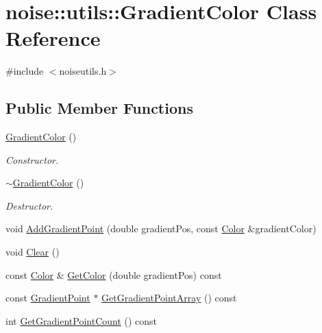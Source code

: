 \hypertarget{classnoise_1_1utils_1_1_gradient_color}{\section{noise\+:\+:utils\+:\+:Gradient\+Color Class Reference}
\label{classnoise_1_1utils_1_1_gradient_color}
}


{\ttfamily \#include $<$noiseutils.\+h$>$}

\subsection*{Public Member Functions}
\begin{DoxyCompactItemize}
\item 
\hyperlink{classnoise_1_1utils_1_1_gradient_color_aef6d8057a751f014c15ccb6ead7d68dd}{Gradient\+Color} ()
\begin{DoxyCompactList}\small\item\em Constructor. \end{DoxyCompactList}\item 
\hyperlink{classnoise_1_1utils_1_1_gradient_color_a766b336606b01981f44cdc9b8b3a097b}{$\sim$\+Gradient\+Color} ()
\begin{DoxyCompactList}\small\item\em Destructor. \end{DoxyCompactList}\item 
void \hyperlink{classnoise_1_1utils_1_1_gradient_color_ac715c443ee7e6456657d131ab0cac42a}{Add\+Gradient\+Point} (double gradient\+Pos, const \hyperlink{classnoise_1_1utils_1_1_color}{Color} \&gradient\+Color)
\item 
void \hyperlink{classnoise_1_1utils_1_1_gradient_color_ae70b2720fc9a51c051d20f9d2575bc94}{Clear} ()
\item 
const \hyperlink{classnoise_1_1utils_1_1_color}{Color} \& \hyperlink{classnoise_1_1utils_1_1_gradient_color_aa77f1cb0b4b7e79727075972ce1d8e29}{Get\+Color} (double gradient\+Pos) const 
\item 
const \hyperlink{structnoise_1_1utils_1_1_gradient_point}{Gradient\+Point} $\ast$ \hyperlink{classnoise_1_1utils_1_1_gradient_color_a3679d2455b1b73f7e25f80609fa90820}{Get\+Gradient\+Point\+Array} () const 
\item 
int \hyperlink{classnoise_1_1utils_1_1_gradient_color_a5755924714ac89914b339f3addc80741}{Get\+Gradient\+Point\+Count} () const 
\item 

\end{DoxyCompactItemize}
